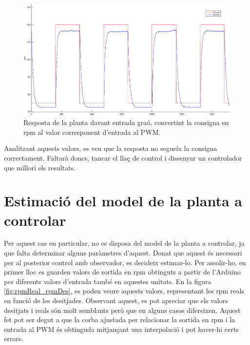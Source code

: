 \documentclass[]{article}
\begin{document}
\begin{figure}[H]
\centering
	\includegraphics[width = .8\linewidth]{images/Entrada_Sortida_Motor.eps}
	\caption{Resposta de la planta davant entrada graó, convertint la consigna en rpm al valor corresponent d'entrada al PWM.}
	\label{fig:ent_sort_motor}
\end{figure}

Analitzant aquests valors, es veu que la resposta no segueix la consigna correctament. Faltarà doncs, tancar el llaç de control i dissenyar un controlador que millori els resultats.

\section{Estimació del model de la planta a controlar}

Per aquest cas en particular, no es disposa del model de la planta a controlar, ja que falta determinar alguns paràmetres d'aquest. Donat que aquest és necessari per al posterior control amb observador, es decideix estimar-lo. Per assolir-ho, en primer lloc es guarden valors de sortida en rpm obtinguts a partir de l'Arduino per diferents valors d'entrada també en aquestes unitats. En la figura \ref{fig:rpmReal_rpmDes}, es poden veure aquests valors, representant les rpm reals en funció de les desitjades. Observant aquest, es pot apreciar que els valors desitjats i reals són molt semblants però que en alguns casos difereixen. Aquest fet pot ser degut a que la corba ajustada per relacionar la sortida en rpm i la entrada al PWM és obtinguda mitjançant una interpolació i pot haver-hi certs errors. 
\end{document}

